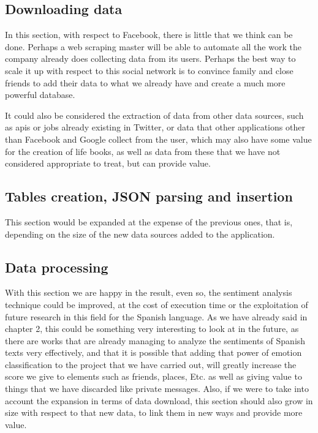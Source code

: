 \subsection*{Downloading data}
In this section, with respect to Facebook, there is little that we think can be done. Perhaps a web scraping master will be able to automate all the work the company already does collecting data from its users. Perhaps the best way to scale it up with respect to this social network is to convince family and close friends to add their data to what we already have and create a much more powerful database.

It could also be considered the extraction of data from other data sources, such as apis or jobs already existing in Twitter, or data that other applications other than Facebook and Google collect from the user, which may also have some value for the creation of life books, as well as data from these that we have not considered appropriate to treat, but can provide value.

\subsection*{Tables creation, JSON parsing and insertion}
This section would be expanded at the expense of the previous ones, that is, depending on the size of the new data sources added to the application.
 
\subsection*{Data processing}
With this section we are happy in the result, even so, the sentiment analysis technique could be improved, at the cost of execution time or the exploitation of future research in this field for the Spanish language. As we have already said in chapter 2, this could be something very interesting to look at in the future, as there are works that are already managing to analyze the sentiments of Spanish texts very effectively, and that it is possible that adding that power of emotion classification to the project that we have carried out, will greatly increase the score we give to elements such as friends, places, Etc. as well as giving value to things that we have discarded like private messages. Also, if we were to take into account the expansion in terms of data download, this section should also grow in size with respect to that new data, to link them in new ways and provide more value.

